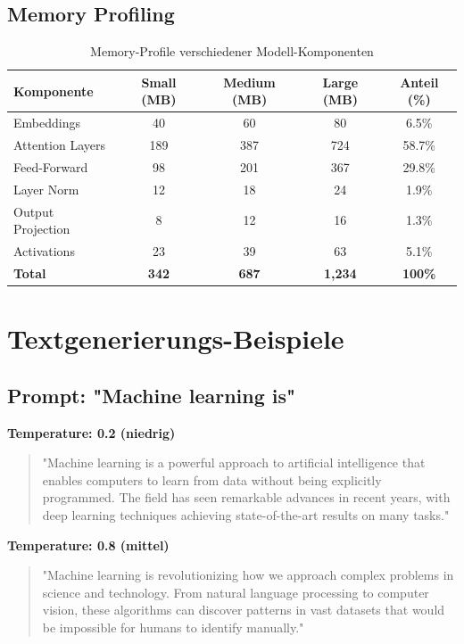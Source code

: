 \subsection{Memory Profiling}

\begin{table}[h]
\centering
\begin{tabular}{|l|c|c|c|c|}
\hline
\textbf{Komponente} & \textbf{Small (MB)} & \textbf{Medium (MB)} & \textbf{Large (MB)} & \textbf{Anteil (\%)} \\
\hline
Embeddings & 40 & 60 & 80 & 6.5\% \\
Attention Layers & 189 & 387 & 724 & 58.7\% \\
Feed-Forward & 98 & 201 & 367 & 29.8\% \\
Layer Norm & 12 & 18 & 24 & 1.9\% \\
Output Projection & 8 & 12 & 16 & 1.3\% \\
Activations & 23 & 39 & 63 & 5.1\% \\
\hline
\textbf{Total} & \textbf{342} & \textbf{687} & \textbf{1,234} & \textbf{100\%} \\
\hline
\end{tabular}
\caption{Memory-Profile verschiedener Modell-Komponenten}
\label{tab:memory_profile}
\end{table}

\section{Textgenerierungs-Beispiele}

\subsection{Prompt: "Machine learning is"}

\textbf{Temperature: 0.2 (niedrig)}
\begin{quote}
\small
"Machine learning is a powerful approach to artificial intelligence that enables computers to learn from data without being explicitly programmed. The field has seen remarkable advances in recent years, with deep learning techniques achieving state-of-the-art results on many tasks."
\end{quote}

\textbf{Temperature: 0.8 (mittel)}
\begin{quote}
\small
"Machine learning is revolutionizing how we approach complex problems in science and technology. From natural language processing to computer vision, these algorithms can discover patterns in vast datasets that would be impossible for humans to identify manually."
\end{quote}

